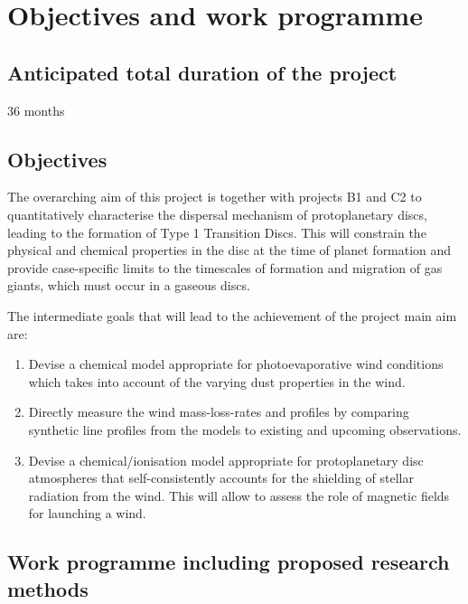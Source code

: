 \documentclass[10pt,fleqn,twoside]{article}
\newcommand{\Tcol}{\color{blue}}
\begin{document}
\section{\Tcol Objectives and work programme}
\renewcommand{\leftmark}{\sc Objectives and work programme}

\subsection{\Tcol Anticipated total duration of the project}

36 months

\subsection{\Tcol Objectives}

The overarching aim of this project is together with projects B1 and C2 to quantitatively characterise the dispersal mechanism of protoplanetary discs, leading to the formation of Type 1 Transition Discs. This will constrain the physical and chemical properties in the disc at the time of planet formation and provide case-specific limits to the timescales of formation and migration of gas giants, which must occur in a gaseous discs. 

The intermediate goals that will lead to the achievement of the project main aim are: 

\begin{enumerate}

\item Devise a chemical model appropriate for photoevaporative wind conditions which takes into account of the varying dust properties in the wind. 
\item Directly measure the wind mass-loss-rates and profiles by
  comparing synthetic line profiles from the models to existing and upcoming observations.
\item Devise a chemical/ionisation model appropriate for
  protoplanetary disc atmospheres that self-consistently accounts for
  the shielding of stellar radiation from the wind. This will allow to
  assess the role of magnetic fields for launching a wind.
\end{enumerate}

\subsection{\Tcol Work programme including proposed research methods}
\end{document}
